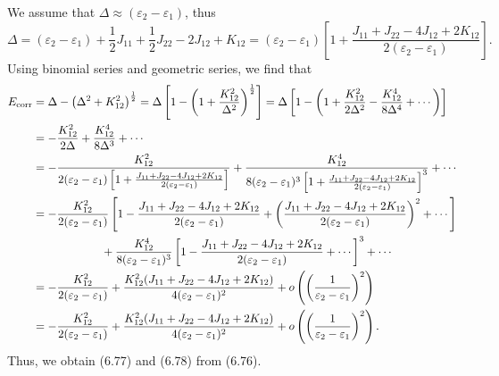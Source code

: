 \documentclass[a4paper]{book}
\newcounter{solution}[chapter]
\newcommand{\corr}{{\rm corr}}
\begin{document}
	\begin{solution}
	We assume that $\Delta \approx (\varepsilon_2 - \varepsilon_1)$, thus	
	\[
		\Delta = ( \varepsilon_2 - \varepsilon_1 ) + \frac{1}{2} J_{11} + \frac{1}{2} J_{22} - 2 J_{12} + K_{12} = ( \varepsilon_2 - \varepsilon_1 ) \left[ 1 + \frac{ J_{11} + J_{22} - 4 J_{12} + 2 K_{12} }{ 2 ( \varepsilon_2 - \varepsilon_1 ) } \right].
	\]
	Using binomial series and geometric series, we find that
	\begin{align*}
		E_\corr &= \Delta - \left( \Delta^2 + K^2_{12} \right)^{\frac{1}{2}} = \Delta \left[ 1 - \left( 1 + \frac{ K^2_{12} }{ \Delta^2 } \right)^{\frac{1}{2}} \right] = \Delta \left[ 1 - \left( 1 + \frac{ K^2_{12} }{ 2\Delta^2 } - \frac{ K^4_{12} }{ 8\Delta^4 } + \cdots \right) \right] \\
		&= - \frac{ K^2_{12} }{ 2\Delta } + \frac{ K^4_{12} }{ 8\Delta^3 } + \cdots \\
		&= - \frac{ K^2_{12} }{ 2( \varepsilon_2 - \varepsilon_1 ) \left[ 1 + \frac{ J_{11} + J_{22} - 4 J_{12} + 2 K_{12} }{ 2 ( \varepsilon_2 - \varepsilon_1 ) } \right] } + \frac{ K^4_{12} }{ 8 ( \varepsilon_2 - \varepsilon_1 )^3 \left[ 1 + \frac{ J_{11} + J_{22} - 4 J_{12} + 2 K_{12} }{ 2 ( \varepsilon_2 - \varepsilon_1 ) } \right]^3 } + \cdots \\
		&= - \frac{ K^2_{12} }{ 2( \varepsilon_2 - \varepsilon_1 )} \left[ 1 - \frac{ J_{11} + J_{22} - 4 J_{12} + 2 K_{12} }{ 2 ( \varepsilon_2 - \varepsilon_1 ) } + \left( \frac{ J_{11} + J_{22} - 4 J_{12} + 2 K_{12} }{ 2 ( \varepsilon_2 - \varepsilon_1 ) } \right)^2 + \cdots \right] \\
		&\hspace{6em} + \frac{ K^4_{12} }{ 8 ( \varepsilon_2 - \varepsilon_1 )^3 } \left[ 1 - \frac{ J_{11} + J_{22} - 4 J_{12} + 2 K_{12} }{ 2 ( \varepsilon_2 - \varepsilon_1 ) } + \cdots \right]^3 + \cdots \\
		&= - \frac{ K^2_{12} }{ 2( \varepsilon_2 - \varepsilon_1 )} + \frac{ K^2_{12} ( J_{11} + J_{22} - 4 J_{12} + 2 K_{12} ) }{ 4( \varepsilon_2 - \varepsilon_1 )^2 } + o\left( \left( \frac{1}{ \varepsilon_2 - \varepsilon_1 } \right)^2 \right) \\
		&= - \frac{ K^2_{12} }{ 2( \varepsilon_2 - \varepsilon_1 )} + \frac{ K^2_{12} ( J_{11} + J_{22} - 4 J_{12} + 2 K_{12} ) }{ 4( \varepsilon_2 - \varepsilon_1 )^2 } + o\left( \left( \frac{1}{ \varepsilon_2 - \varepsilon_1 } \right)^2 \right) .
	\end{align*}
	Thus, we obtain (6.77) and (6.78) from (6.76).
	
	\end{solution}
	
\end{document}
